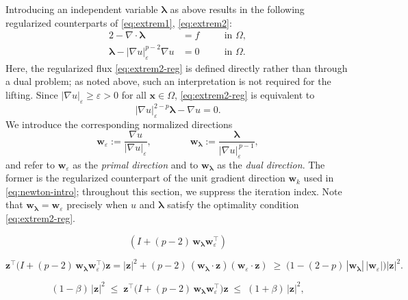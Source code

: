 \documentclass[10pt,a4paper]{amsart}
\newcommand{\bs}[1]{\ensuremath{\boldsymbol{#1}}}
\begin{document}
Introducing an independent variable $\bs\lambda$ as above results in
the following regularized counterparts of \eqref{eq:extrem1}, \eqref{eq:extrem2}:
\begin{alignat}{2}
-\nabla\!\cdot\!\bs\lambda &= f \quad &&\text{in }\Omega,\label{eq:extrem1-reg}\\
\bs\lambda - |\nabla u|_\varepsilon^{p-2}\nabla u &= 0 &&\text{in }\Omega.\label{eq:extrem2-reg}
\end{alignat}
Here, the regularized flux \eqref{eq:extrem2-reg} is defined directly rather than through a dual problem; as noted above, such an interpretation is not required for the lifting.
Since $|\nabla u|_\varepsilon\geq\varepsilon>0$ for all $\bs x\in\Omega$, \eqref{eq:extrem2-reg} is equivalent to
\begin{equation}\label{eq:extrem2-mod-reg}
|\nabla u|_\varepsilon^{2-p}\bs\lambda - \nabla u=0.
\end{equation}
We introduce the corresponding normalized directions
\begin{equation}\label{eq:w-directions}
  \bs w_\varepsilon := \frac{\nabla u}{|\nabla u|_\varepsilon},
  \qquad\qquad
  \bs w_{\bs\lambda} := \frac{\bs\lambda}{|\nabla u|_\varepsilon^{\,p-1}},
\end{equation}
and refer to $\bs w_\varepsilon$ as the \emph{primal direction} and to $\bs w_{\bs\lambda}$ as the \emph{dual direction}. The former is the regularized counterpart of the unit gradient direction $\bs w_k$ used in \eqref{eq:newton-intro}; throughout this section, we suppress the iteration index. Note that $\bs w_{\bs\lambda}=\bs w_\varepsilon$ precisely when $u$ and $\bs\lambda$ satisfy the optimality condition \eqref{eq:extrem2-reg}.

\begin{equation}\label{eq:lifted-tensor}
    \left(I + (p-2)\,\bs w_{\bs\lambda}\bs w_\varepsilon^\top\right)
\end{equation}

\begin{equation}\label{eq:tensor-quadratic-form}
  \bs z^\top\bigl(I + (p-2)\,\bs w_{\bs\lambda}\bs w_\varepsilon^\top\bigr)\bs z
  = |\bs z|^2 + (p-2)\,(\bs w_{\bs\lambda}\cdot\bs z)(\bs w_\varepsilon \cdot \bs z)
  \;\ge\; \bigl(1-(2-p)\,|\bs w_{\bs\lambda}|\,|\bs w_\varepsilon|\bigr)|\bs z|^2 .
\end{equation}

\begin{equation}\label{eq:tensor-sandwich}
  (1-\beta)\,|\bs z|^2
  \;\le\; \bs z^\top\bigl(I + (p-2)\,\bs w_{\bs\lambda}\bs w_\varepsilon^\top\bigr)\bs z
  \;\le\; (1+\beta)\,|\bs z|^2 ,
\end{equation}
\end{document}
